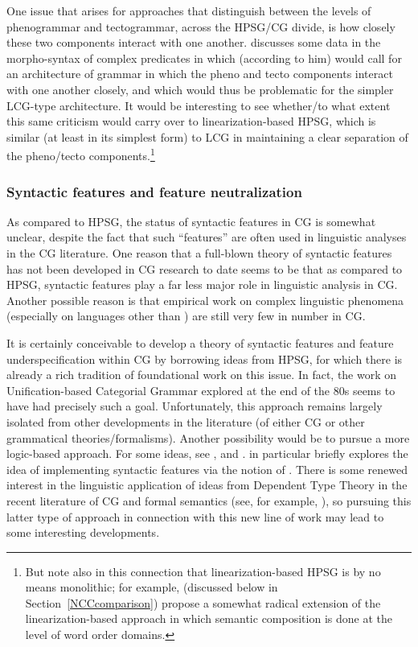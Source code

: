 \documentclass[output=paper
                ,modfonts
 	        ,biblatex
                ,babelshorthands
                ,newtxmath
                ,draftmode
                ,colorlinks, citecolor=brown
]{langscibook}
\begin{document}
One issue that arises for approaches that distinguish between the
levels of phenogrammar and tectogrammar, across the HPSG/CG divide, is
how closely these two components interact with one another.
\citet[Section~2.3]{Kubota2014a-u} discusses some data in the morpho-syntax of
complex predicates in  which (according to him) would call for
an architecture of grammar in which the pheno and tecto components
interact with one another closely, and which would thus be problematic
for the simpler LCG-type architecture. It would be interesting to see
whether/to what extent this same criticism would carry over to
linearization-based HPSG, which is similar (at least in its simplest
form) to LCG in maintaining a clear separation of the pheno/tecto
components.\footnote{But note also in this connection that
linearization-based HPSG is by no means monolithic; for example,
\citet{yatabe-tam2017} (discussed below in
Section~\ref{NCCcomparison}) propose a somewhat radical extension of
the linearization-based approach in which semantic composition is done at
the level of word order domains.}


\subsubsection{Syntactic features and feature neutralization}

As compared to HPSG, the status of syntactic features in CG is
somewhat unclear, despite the fact that such ``features'' are often used
in linguistic analyses in the CG literature. One reason that a
full-blown theory of syntactic features has not been developed in CG
research to date seems to be that as compared to HPSG, syntactic
features play a far less major role in linguistic analysis in CG.
Another possible reason is that empirical work on complex linguistic
phenomena (especially on languages other than ) are still very
few in number in CG. 

It is certainly conceivable to develop a theory of syntactic features
and feature underspecification within CG by borrowing ideas from HPSG,
for which there is already a rich tradition of foundational work on this
issue. In fact, the work on Unification-based Categorial Grammar
\citep{CalderEA1988} explored at the end of the 80s seems to have had
precisely such a goal. Unfortunately, this approach remains largely
isolated from other developments in the literature (of either CG or
other grammatical theories/formalisms). Another possibility would be to pursue a
more logic-based approach. For some ideas, see \citet{BJ95},
\citet{Bayer96}
and \citet{Morrill94a-u}. \citet[Chapter 6]{Morrill94a-u} in particular briefly
explores the idea of implementing syntactic features via the notion of
. There is some renewed interest in
the linguistic application of ideas from Dependent
Type Theory \citep{MartinLofIntuitionistic} in the recent literature
of CG and formal semantics (see, for example,
\citealt{ChatzikyriakidisLuo2017}), so pursuing this latter type of
approach in connection with this new line of work may lead to some
interesting developments.
\end{document}
